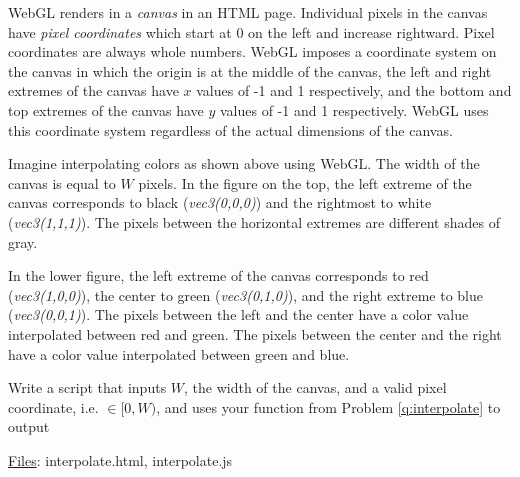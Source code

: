 \documentclass[addpoints]{exam}
\begin{document}
\begin{questions}
  WebGL renders in a \emph{canvas} in an HTML page. Individual pixels in the canvas have \emph{pixel coordinates} which start at 0 on the left and increase rightward. Pixel coordinates are always whole numbers. WebGL imposes a coordinate system on the canvas in which the origin is at the middle of the canvas, the left and right extremes of the canvas have $x$ values of -1 and 1 respectively, and the bottom and top extremes of the canvas have $y$ values of -1 and 1 respectively. WebGL uses this coordinate system regardless of the actual dimensions of the canvas.

  Imagine interpolating colors as shown above using WebGL. The width of the canvas is equal to $W$ pixels. In the figure on the top, the left extreme of the canvas corresponds to black (\emph{vec3(0,0,0)}) and the rightmost to white (\emph{vec3(1,1,1)}). The pixels between the horizontal extremes are different shades of gray. 

  In the lower figure, the left extreme of the canvas corresponds to red (\emph{vec3(1,0,0)}), the center to green (\emph{vec3(0,1,0)}), and the right extreme to blue (\emph{vec3(0,0,1)}). The pixels between the left and the center have a color value interpolated between red and green. The pixels between the center and the right have a color value interpolated between green and blue.

  Write a script that inputs $W$, the width of the canvas, and a valid pixel coordinate, i.e. $\in [0, W)$, and uses your function from Problem \ref{q:interpolate} to output
  \noindent\underline{Files}: {interpolate.html, interpolate.js}




\end{questions}
\end{document}
